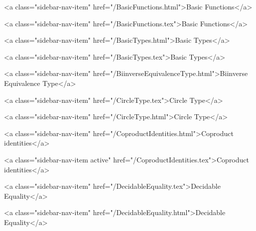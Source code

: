       
    
      
        
          <a class="sidebar-nav-item" href="/BasicFunctions.html">Basic Functions</a>
        
      
    
      
        
          <a class="sidebar-nav-item" href="/BasicFunctions.tex">Basic Functions</a>
        
      
    
      
        
          <a class="sidebar-nav-item" href="/BasicTypes.html">Basic Types</a>
        
      
    
      
        
          <a class="sidebar-nav-item" href="/BasicTypes.tex">Basic Types</a>
        
      
    
      
        
          <a class="sidebar-nav-item" href="/BiinverseEquivalenceType.html">Biinverse Equivalence Type</a>
        
      
    
      
        
          <a class="sidebar-nav-item" href="/CircleType.tex">Circle Type</a>
        
      
    
      
        
          <a class="sidebar-nav-item" href="/CircleType.html">Circle Type</a>
        
      
    
      
        
          <a class="sidebar-nav-item" href="/CoproductIdentities.html">Coproduct identities</a>
        
      
    
      
        
          <a class="sidebar-nav-item active" href="/CoproductIdentities.tex">Coproduct identities</a>
        
      
    
      
        
          <a class="sidebar-nav-item" href="/DecidableEquality.tex">Decidable Equality</a>
        
      
    
      
        
          <a class="sidebar-nav-item" href="/DecidableEquality.html">Decidable Equality</a>
        
